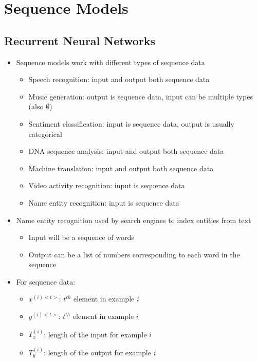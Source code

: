 \documentclass[12pt, letterpaper]{article}
\begin{document}
    \section{Sequence Models}
    \subsection{Recurrent Neural Networks}
    \begin{itemize}
        \item Sequence models work with different types of sequence data
        \begin{itemize}
            \item Speech recognition: input and output both sequence data
            \item Music generation: output is sequence data, input can be multiple types (also $\emptyset$)
            \item Sentiment classification: input is sequence data, output is usually categorical
            \item DNA sequence analysis: input and output both sequence data
            \item Machine translation: input and output both sequence data
            \item Video activity recognition: input is sequence data
            \item Name entity recognition: input is sequence data 
        \end{itemize} 
        \item Name entity recognition used by search engines to index entities from text
        \begin{itemize}
            \item Input will be a sequence of words
            \item Output can be a list of numbers corresponding to each word in the sequence
        \end{itemize}
        \item For sequence data:
        \begin{itemize}
            \item $x^{(i)<t>}$: $t^{th}$ element in example $i$
            \item $y^{(i)<t>}$: $t^{th}$ element in example $i$
            \item $T_x^{(i)}$: length of the input for example $i$
            \item $T_y^{(i)}$: length of the output for example $i$
        \end{itemize}

\end{itemize}
\end{document}
